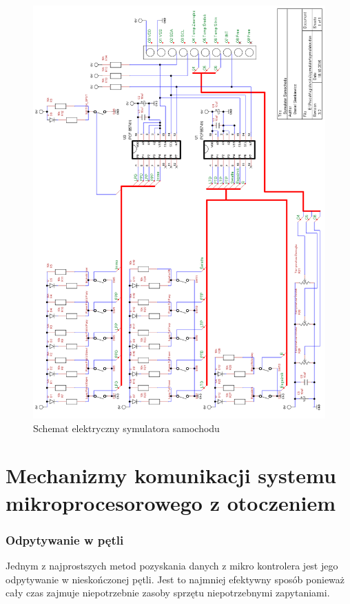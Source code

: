 \documentclass{xmgr}
\begin{document}
\begin{figure}[!p]
    \centering
    	\includegraphics[height=0.9\textheight]{images/symulator.png}
    \caption{Schemat elektryczny symulatora samochodu}
\end{figure}


\chapter{Mechanizmy komunikacji systemu mikroprocesorowego z otoczeniem}
\subsection{Odpytywanie w pętli}
Jednym z najprostszych metod pozyskania danych z mikro kontrolera jest jego odpytywanie w nieskończonej pętli. Jest to najmniej efektywny sposób ponieważ cały czas zajmuje niepotrzebnie zasoby sprzętu niepotrzebnymi zapytaniami.
\end{document}
